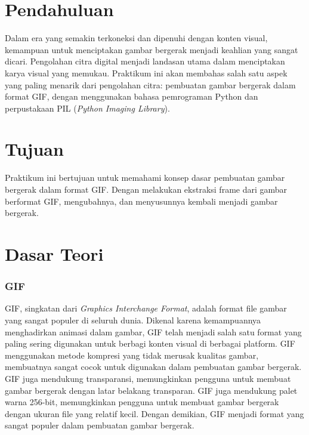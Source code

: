 \documentclass{assignment}
\date{24 Februari 2024}
\newcommand\tab[1][0.5cm]{\hspace*{#1}}
\begin{document}
\section*{Pendahuluan}
\tab Dalam era yang semakin terkoneksi dan dipenuhi dengan konten visual, kemampuan untuk menciptakan gambar bergerak menjadi keahlian yang sangat dicari. Pengolahan citra digital menjadi landasan utama dalam menciptakan karya visual yang memukau. Praktikum ini akan membahas salah satu aspek yang paling menarik dari pengolahan citra: pembuatan gambar bergerak dalam format GIF, dengan menggunakan bahasa pemrograman Python dan perpustakaan PIL (\textit{Python Imaging Library}).


\section*{Tujuan}
\tab Praktikum ini bertujuan untuk memahami konsep dasar pembuatan gambar bergerak dalam format GIF. Dengan melakukan ekstraksi frame dari gambar berformat GIF, mengubahnya, dan menyusunnya kembali menjadi gambar bergerak.


\section*{Dasar Teori}
\subsubsection*{GIF}
\tab GIF, singkatan dari \textit{Graphics Interchange Format}, adalah format file gambar yang sangat populer di seluruh dunia. Dikenal karena kemampuannya menghadirkan animasi dalam gambar, GIF telah menjadi salah satu format yang paling sering digunakan untuk berbagi konten visual di berbagai platform. GIF menggunakan metode kompresi yang tidak merusak kualitas gambar, membuatnya sangat cocok untuk digunakan dalam pembuatan gambar bergerak. GIF juga mendukung transparansi, memungkinkan pengguna untuk membuat gambar bergerak dengan latar belakang transparan. GIF juga mendukung palet warna 256-bit, memungkinkan pengguna untuk membuat gambar bergerak dengan ukuran file yang relatif kecil. Dengan demikian, GIF menjadi format yang sangat populer dalam pembuatan gambar bergerak.
\end{document}
